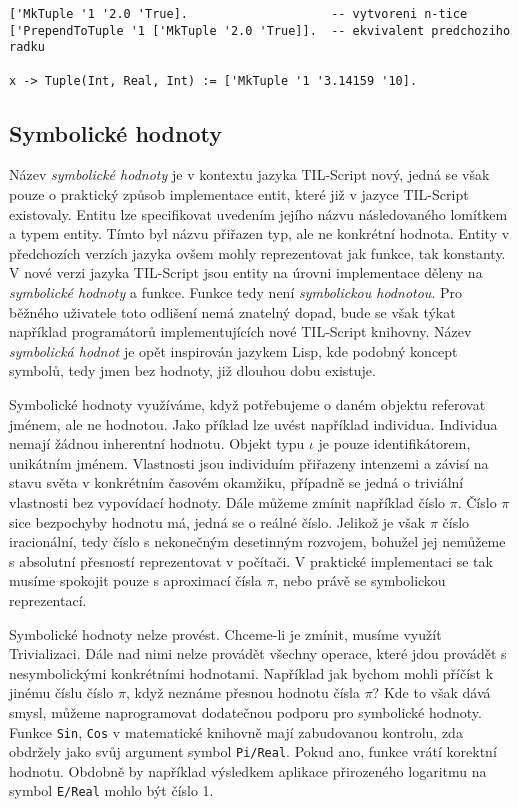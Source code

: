 \begin{lstlisting}[caption={Příklad využití n-tic}]
['MkTuple '1 '2.0 'True].                    -- vytvoreni n-tice
['PrependToTuple '1 ['MkTuple '2.0 'True]].  -- ekvivalent predchoziho radku

x -> Tuple(Int, Real, Int) := ['MkTuple '1 '3.14159 '10].
\end{lstlisting}

\subsection{Symbolické hodnoty}\label{symbolic-values}

Název \textit{symbolické hodnoty} je v kontextu jazyka TIL-Script nový, jedná se však pouze o
praktický způsob implementace entit, které již v jazyce TIL-Script existovaly. Entitu lze
specifikovat uvedením jejího názvu následovaného lomítkem a typem entity. Tímto byl názvu přiřazen
typ, ale ne konkrétní hodnota. Entity v předchozích verzích jazyka ovšem mohly reprezentovat jak
funkce, tak konstanty. V nové verzi jazyka TIL-Script jsou entity na úrovni implementace děleny
na \textit{symbolické hodnoty} a funkce. Funkce tedy není \textit{symbolickou hodnotou}.
Pro běžného uživatele toto odlišení nemá znatelný dopad, bude se však týkat například programátorů
implementujících nové TIL-Script knihovny. Název \textit{symbolická hodnot} je opět inspirován
jazykem Lisp, kde podobný koncept symbolů, tedy jmen bez hodnoty, již dlouhou dobu existuje.

Symbolické hodnoty využíváme, když potřebujeme o daném objektu referovat jménem, ale ne hodnotou.
Jako příklad lze uvést například individua. Individua nemají žádnou inherentní hodnotu. Objekt
typu $\iota$ je pouze identifikátorem, unikátním jménem. Vlastnosti jsou individuím přiřazeny
intenzemi a závisí na stavu světa v konkrétním časovém okamžiku, případně se jedná o triviální
vlastnosti bez vypovídací hodnoty. Dále můžeme zmínit například číslo $\pi$. Číslo $\pi$ sice
bezpochyby hodnotu má, jedná se o reálné číslo. Jelikož je však $\pi$ číslo iracionální, tedy číslo
s nekonečným desetinným rozvojem, bohužel jej nemůžeme s absolutní přesností reprezentovat
v počítači. V praktické implementaci se tak musíme spokojit pouze s aproximací čísla $\pi$, nebo
právě se symbolickou reprezentací.

Symbolické hodnoty nelze provést. Chceme-li je zmínit, musíme využít Trivializaci. Dále nad nimi
nelze provádět všechny operace, které jdou provádět s nesymbolickými konkrétními hodnotami.
Například jak bychom mohli příčíst k jinému číslu číslo $\pi$, když neznáme přesnou hodnotu čísla
$\pi$? Kde to však dává smysl, můžeme naprogramovat dodatečnou podporu pro symbolické hodnoty.
Funkce \lstinline{Sin}, \lstinline{Cos} v matematické knihovně mají zabudovanou kontrolu, zda
obdržely jako svůj argument symbol \lstinline{Pi/Real}. Pokud ano, funkce vrátí korektní
hodnotu. Obdobně by například výsledkem aplikace přirozeného logaritmu na symbol \lstinline{E/Real}
mohlo být číslo 1.

